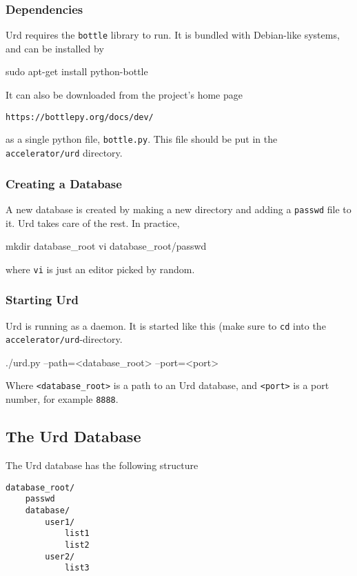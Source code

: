 \subsubsection{Dependencies}
Urd requires the \texttt{bottle} library to run.  It is bundled with
Debian-like systems, and can be installed by
\begin{shell}
sudo apt-get install python-bottle
\end{shell}
It can also be downloaded from the project's home page
\begin{verbatim}
https://bottlepy.org/docs/dev/
\end{verbatim}
as a single python file, \texttt{bottle.py}.  This file should be put
in the \texttt{accelerator/urd} directory.



\subsubsection{Creating a Database}
A new database is created by making a new directory and adding
a \texttt{passwd} file to it.  Urd takes care of the rest.  In
practice,
\begin{shell}
mkdir database_root
vi database_root/passwd
\end{shell}
where \texttt{vi} is just an editor picked by random.


\subsubsection{Starting Urd}
Urd is running as a daemon.  It is started like this (make sure
to \texttt{cd} into the \texttt{accelerator/urd}-directory.
\begin{shell}
./urd.py --path=<database_root> --port=<port>
\end{shell}
Where \texttt{<database\_root>} is a path to an Urd database,
and \texttt{<port>} is a port number, for example \texttt{8888}.

\subsection{The Urd Database}
The Urd database has the following structure
\begin{verbatim}
database_root/
    passwd
    database/
        user1/
            list1
            list2
        user2/
            list3
\end{verbatim}

